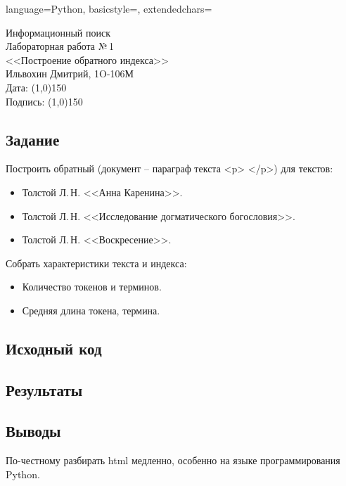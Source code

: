 \documentclass[12pt]{article}
\newcommand{\StudentName}{Ильвохин Дмитрий}
\newcommand{\Group}{1O-106М}
\newcommand{\CourseName}{Информационный поиск}
\newcommand{\LabNum}{1}
\newcommand{\Subject}{Построение обратного индекса}
\begin{document}
\lstset
{
        language=Python,
        basicstyle=\scriptsize,%
        extendedchars=\true
}

\begin{flushright}
\Large{
	\CourseName \\
	Лабораторная работа №\,\LabNum \\
	<<\Subject>> \\
  \StudentName, \Group \\
  Дата: \line(1,0){150} \\
  Подпись: \line(1,0){150} \\
}
\end{flushright}

\subsection*{Задание}
Построить обратный (документ -- параграф текста <p> </p>) для текстов:
\begin{itemize}
  \item Толстой Л.\,Н. <<Анна Каренина>>.
  \item Толстой Л.\,Н. <<Исследование догматического богословия>>.
  \item Толстой Л.\,Н. <<Воскресение>>.
\end{itemize}

Собрать характеристики текста и индекса:
\begin{itemize}
  \item Количество токенов и терминов.
  \item Средняя длина токена, термина.
\end{itemize}

\subsection*{Исходный код}


\subsection*{Результаты}


\subsection*{Выводы}
По-честному разбирать html медленно, особенно на языке программирования Python.
\end{document}
